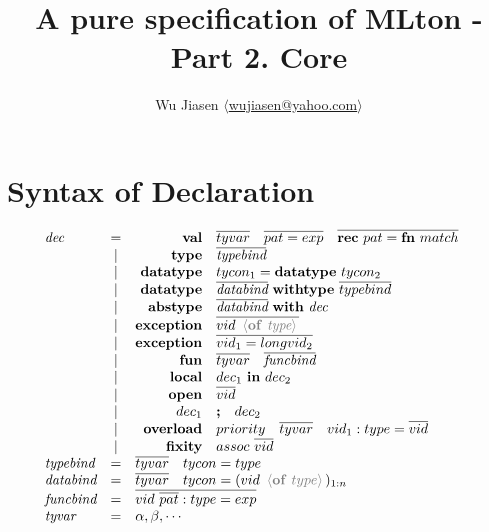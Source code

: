 \documentclass[11pt,a4paper]{article}
\newcommand{\key}[1]{\textrm{\textbf{#1}}}
\newcommand{\prodlhs}[1]{\textit{#1}}
\newcommand{\angled}[1]{\,{\color{gray}\langle#1\rangle}\,}
\begin{document}
\title {A pure specification of MLton - Part 2. Core}
\author{Wu Jiasen $\langle$\href{mailto:wujiasen@yahoo.com}{wujiasen@yahoo.com}$\rangle$}
\maketitle 
\thispagestyle{fancy}

\section{Syntax of Declaration}
{\renewcommand{\arraystretch}{1.2}\[
\begin{array}{lcrll}
\prodlhs{dec}
     & = & \key{val}  	  & \overline{tyvar} \quad \overline{pat = exp} \quad \overline{\key{rec}\ pat = \key{fn}\ match} &\\
     & | & \key{type} 	  & \overline{\prodlhs{typebind}}                                &\\
     & | & \key{datatype} & tycon_1 = \key{datatype}\ tycon_2                            &\\
     & | & \key{datatype} & \overline{\prodlhs{databind}} \ \key{withtype}\ \overline{typebind} &\\
     & | & \key{abstype}  & \overline{\prodlhs{databind}} \ \key{with}\ \prodlhs{dec}      &\\
     & | & \key{exception}& \overline{vid\ \angled{\key{of}\ \prodlhs{type}}}   &\\
     & | & \key{exception}& \overline{vid_1 = longvid_2}               &\\
     & | & \key{fun}      & \overline{tyvar} \quad \overline{\prodlhs{funcbind}} &\\
     & | & \key{local}    & \prodlhs{$dec_1$} \ \key{in}\ \prodlhs{$dec_2$}     &\\
     & | & \key{open}     & \overline{vid}                          	&\\
     & | & \prodlhs{$dec_1$} & \key{;}\quad \prodlhs{$dec_2$} &\\
     & | & \key{overload} & priority \quad \overline{tyvar} \quad vid_1:type=\overline{vid}&\\
     & | & \key{fixity}   & assoc\ \overline{vid}                      &\\
\prodlhs{typebind} 
     & = & \multicolumn{2}{l}{\overline{tyvar} \quad tycon = type } 		&\\
\prodlhs{databind}
	 & = & \multicolumn{2}{l}{\overline{tyvar} \quad tycon = (vid \ \angled{\key{of}\ type})_{1:n} } 		&\\
\prodlhs{funcbind}
	 & = & \multicolumn{2}{l}{\overline{vid \ \overline{pat}:type = exp}} &\\
\prodlhs{tyvar}
     & = & \multicolumn{2}{l}{\alpha,\beta,\cdots} &\\
\end{array}
\]}
\end{document}
